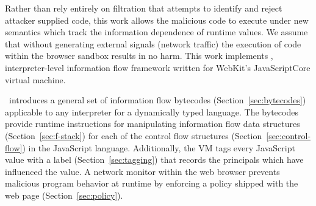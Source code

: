 \begin{comment}
\todo{categorize XSS?}

\begin{itemize}
    \item say that js handles sensitive info
    \item delineate injection
    \item categorize xss
    \item pound-include problem
    \item scare-monger prevalence as `buffer overflow'
    \item sandbox + same origin policy
    \item have to setup an attacker model?
\end{itemize}

\end{comment}

Rather than rely entirely on filtration that attempts to identify and reject attacker supplied code, this work allows the malicious code to execute under new semantics which track the information dependence of runtime values.
We assume that without generating external signals (network traffic) the execution of code within the browser sandbox results in no harm.
This work implements \FlowCore, interpreter-level information flow framework written for WebKit's JavaScriptCore virtual machine.

\FlowCore\ introduces a general set of information flow bytecodes (Section~\ref{sec:bytecodes}) applicable to any interpreter for a dynamically typed language.
The bytecodes provide runtime instructions for manipulating information flow data structures (Section~\ref{sec:f-stack}) for each of the control flow structures (Section~\ref{sec:control-flow}) in the JavaScript language.
Additionally, the VM tags every JavaScript value with a label (Section~\ref{sec:tagging}) that records the principals which have influenced the value.
A network monitor within the web browser prevents malicious program behavior at runtime by enforcing a policy shipped with the web page (Section~\ref{sec:policy}).

\begin{comment}
on using information flow techniques which can detect and prevent malicious behavior of executing programs.

- change language semantics
- augment memory model with labels
- detect and intercept xss
- prevent information leakage

Combine earlier approaches into a universal and comprehensive framework
- decentralized labeling
- support more flexible policies
- hybrid static/dynamic analysis
- dynamically track information flow
- pervasively works at the lowest layer
\end{comment}
